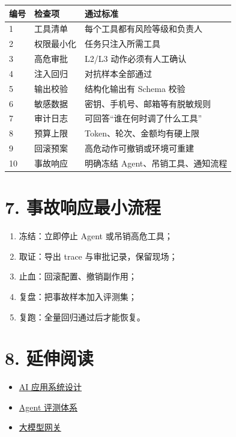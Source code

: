\documentclass[9pt,a4paper,twocolumn]{ctexart}
\begin{document}
{\footnotesize
\begin{tabular}{|p{}|p{}|p{}|}
\hline
\textbf{编号} & \textbf{检查项} & \textbf{通过标准} \\
\hline
1 & 工具清单 & 每个工具都有风险等级和负责人 \\
\hline
2 & 权限最小化 & 任务只注入所需工具 \\
\hline
3 & 高危审批 & L2/L3 动作必须有人工确认 \\
\hline
4 & 注入回归 & 对抗样本全部通过 \\
\hline
5 & 输出校验 & 结构化输出有 Schema 校验 \\
\hline
6 & 敏感数据 & 密钥、手机号、邮箱等有脱敏规则 \\
\hline
7 & 审计日志 & 可回答“谁在何时调了什么工具” \\
\hline
8 & 预算上限 & Token、轮次、金额均有硬上限 \\
\hline
9 & 回滚预案 & 高危动作可撤销或环境可重建 \\
\hline
10 & 事故响应 & 明确冻结 Agent、吊销工具、通知流程 \\
\hline
\end{tabular}
}



\section*{7. 事故响应最小流程}

\begin{enumerate}[itemsep=1pt, topsep=2pt]
  \item 冻结：立即停止 Agent 或吊销高危工具；
  \item 取证：导出 trace 与审批记录，保留现场；
  \item 止血：回滚配置、撤销副作用；
  \item 复盘：把事故样本加入评测集；
  \item 复跑：全量回归通过后才能恢复。
\end{enumerate}


\section*{8. 延伸阅读}

\begin{itemize}[itemsep=1pt, topsep=2pt]
  \item \href{../07-系统设计/01-AI应用系统设计.md}{AI 应用系统设计}
  \item \href{../05-评测与质量/01-Agent评测体系.md}{Agent 评测体系}
  \item \href{../04-工程实践/04-大模型网关.md}{大模型网关}
\end{itemize}
\end{document}
